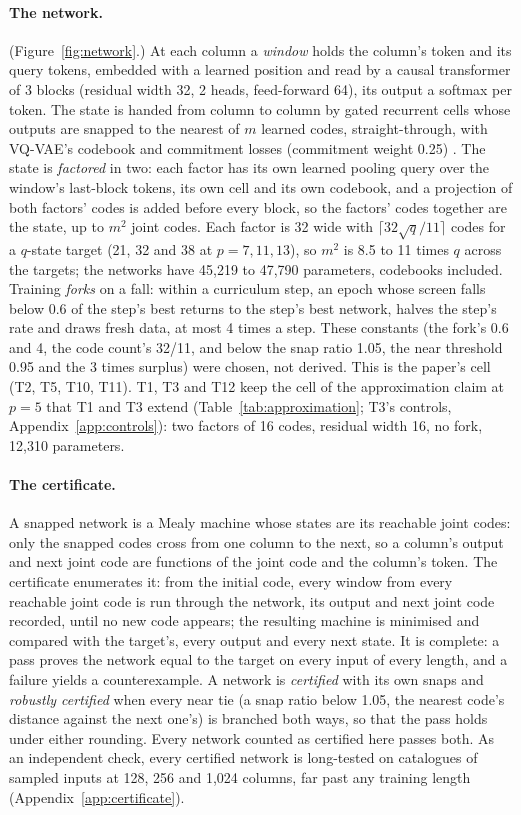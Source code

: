\documentclass[11pt]{article}
\begin{document}
\paragraph{The network.} (Figure~\ref{fig:network}.) At each column a \emph{window} holds the column's token and its query
tokens, embedded with a learned position and read by a causal transformer of 3 blocks (residual width
32, 2 heads, feed-forward 64), its output a softmax per token. The state is handed from column to
column by gated recurrent cells whose outputs are snapped to the nearest of $m$ learned codes,
straight-through, with VQ-VAE's codebook and commitment losses (commitment weight 0.25)
\citep{van-den-oord-2017-vq-vae-neural-discrete-representation}. The state is \emph{factored} in two:
each factor has its own learned pooling query over the window's last-block tokens, its own cell and
its own codebook, and a projection of both factors' codes is added before every block, so the
factors' codes together are the state, up to $m^2$ joint codes. Each factor is 32 wide with
$\lceil 32\sqrt{q}/11 \rceil$ codes for a $q$-state target (21, 32 and 38 at $p = 7, 11, 13$), so
$m^2$ is 8.5 to 11 times $q$ across the targets; the networks have 45{,}219 to 47{,}790 parameters, codebooks
included. Training \emph{forks} on a fall: within a curriculum step, an epoch whose screen falls
below 0.6 of the step's best returns to the step's best network, halves the step's rate and draws
fresh data, at most 4 times a step. These constants (the fork's 0.6 and 4, the code count's 32/11, and below
the snap ratio 1.05, the near threshold 0.95 and the 3 times surplus) were chosen, not derived. This
is the paper's cell (T2, T5, T10, T11). T1, T3 and T12 keep the cell of the approximation claim at
$p = 5$ that T1 and T3 extend (Table~\ref{tab:approximation}; T3's controls,
Appendix~\ref{app:controls}): two
factors of 16 codes, residual width 16, no fork, 12{,}310 parameters.

\paragraph{The certificate.} A snapped network is a Mealy machine whose states are its reachable joint
codes: only the snapped codes cross from one column to the next, so a column's output and next joint
code are functions of the joint code and the column's token. The certificate enumerates it: from the initial code, every window from every reachable joint
code is run through the network, its output and next joint code recorded, until no new code appears;
the resulting machine is minimised and compared with the target's, every output and every next state. It is complete: a pass proves the network equal to
the target on every input of every length, and a failure yields a counterexample. A network
is \emph{certified} with its own snaps and \emph{robustly certified} when every near tie (a snap
ratio below 1.05, the nearest code's distance against the next one's) is branched both ways, so that
the pass holds under either rounding. Every network counted as certified here passes both. As an
independent check, every certified network is long-tested on catalogues of sampled inputs at
128, 256 and 1{,}024 columns, far past any training length (Appendix~\ref{app:certificate}).
\end{document}
